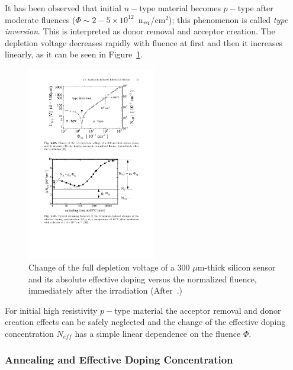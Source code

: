  It has been observed that initial $n-$type material becomes $p-$type after moderate fluences 
 ($\Phi\sim2-5\times10^{12}$~n$_{\rm eq}$/cm$^2$); this phenomenon is called {\it type inversion}. 
 This is interpreted as donor removal and acceptor creation. The depletion voltage decreases rapidly 
 with fluence at 
 first and then it increases linearly, as it can be seen in Figure~\ref{fig:typeinversion}.
 
 \begin{figure}[htpb]
 \centering
 \includegraphics[width=0.5\textwidth]{typeinversion.pdf}
 \caption{\label{fig:typeinversion} Change of the full depletion voltage of a 300 $\mu$m-thick silicon 
 sensor and its absolute effective doping versus the normalized fluence, immediately after the irradiation (After~\cite{wunstors-thesis}.)}
 \end{figure}

For initial high resistivity $p-$type material the acceptor removal and donor creation effects can be 
safely neglected and the change of the effective doping concentration $N_{eff}$ has a simple linear 
dependence on the fluence $\Phi$.





\subsubsection{Annealing and Effective Doping Concentration}


